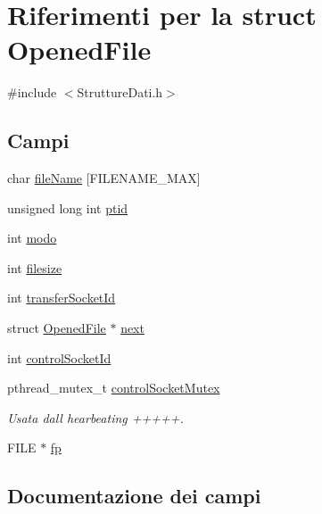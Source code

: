 \hypertarget{structOpenedFile}{}\section{Riferimenti per la struct Opened\+File}
\label{structOpenedFile}


{\ttfamily \#include $<$Strutture\+Dati.\+h$>$}

\subsection*{Campi}
\begin{DoxyCompactItemize}
\item 
char \hyperlink{structOpenedFile_a060ea540c44e9570b59a0e2297e9d47b}{file\+Name} \mbox{[}F\+I\+L\+E\+N\+A\+M\+E\+\_\+\+M\+AX\mbox{]}
\item 
unsigned long int \hyperlink{structOpenedFile_a33cb5376fd14129a1635cf142c0781a6}{ptid}
\item 
int \hyperlink{structOpenedFile_a6d9f22ff6ba81506ba9c4a60f27c4f32}{modo}
\item 
int \hyperlink{structOpenedFile_a3b2e157f5aad06b65bd017d67fde4eb3}{filesize}
\item 
int \hyperlink{structOpenedFile_a2b10a150aba89a8d193cd251012682a7}{transfer\+Socket\+Id}
\item 
struct \hyperlink{structOpenedFile}{Opened\+File} $\ast$ \hyperlink{structOpenedFile_a1d8b0791af363423c6d93a0699237718}{next}
\item 
int \hyperlink{structOpenedFile_a591b34fa52d94c831734d7cead0c6630}{control\+Socket\+Id}
\item 
pthread\+\_\+mutex\+\_\+t \hyperlink{structOpenedFile_a59d8fd7142cc9f6a40828160a0f5fc08}{control\+Socket\+Mutex}
\begin{DoxyCompactList}\small\item\em Usata dall\textquotesingle{} hearbeating +++++. \end{DoxyCompactList}\item 
F\+I\+LE $\ast$ \hyperlink{structOpenedFile_a9cdcaccacb2eb66a17c0781666c28b15}{fp}
\end{DoxyCompactItemize}


\subsection{Documentazione dei campi}

